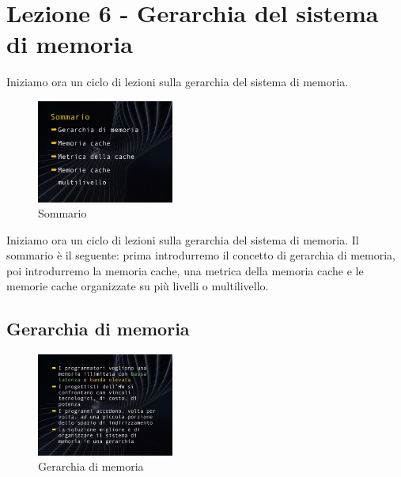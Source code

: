 \chapter{Lezione 6 - Gerarchia del sistema di memoria}

Iniziamo ora un ciclo di lezioni sulla gerarchia del sistema di memoria.

\FloatBarrier
\begin{figure}[H]
  \centering
  \includegraphics[width=0.40\textwidth,
                    trim=40 60 10 40, %
                    clip]
                    {images/Lez06_p01_fig_02.png}
  \caption{Sommario}
  \label{fig:Lez06_p01_fig_02}
\end{figure}
\FloatBarrier
\noindent

Iniziamo ora un ciclo di lezioni sulla gerarchia del sistema di memoria.
Il sommario è il seguente: prima introdurremo il concetto di gerarchia di memoria, poi introdurremo la memoria cache, una metrica della memoria cache e le memorie cache organizzate su più livelli o multilivello.


\section{Gerarchia di memoria}

\FloatBarrier
\begin{figure}[H]
  \centering
  \includegraphics[width=0.40\textwidth,
                    trim=40 20 10 40, %
                    clip]
                    {images/Lez06_p01_fig_04.png}
  \caption{Gerarchia di memoria}
  \label{fig:Lez06_p01_fig_04}
\end{figure}
\FloatBarrier
\noindent

